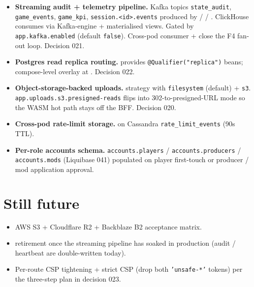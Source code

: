 \documentclass[11pt,a4paper,openany]{book}
\begin{document}
\begin{itemize}
  \item \textbf{Streaming audit + telemetry pipeline.} Kafka topics
        \texttt{state\_audit}, \texttt{game\_events},
        \texttt{game\_kpi}, \texttt{session.<id>.events} produced by
         /  /
        . ClickHouse consumes via
        Kafka-engine + materialised views. Gated by
        \texttt{app.kafka.enabled} (default \texttt{false}). Cross-pod
        consumer +  close the F4
        fan-out loop. Decision 021.
  \item \textbf{Postgres read replica routing.}
         provides
        \texttt{@Qualifier("replica")} beans; compose-level overlay at
        . Decision 022.
  \item \textbf{Object-storage-backed uploads.}
         strategy with \texttt{filesystem}
        (default) + \texttt{s3}. \texttt{app.uploads.s3.presigned-reads}
        flips  into 302-to-presigned-URL
        mode so the WASM hot path stays off the BFF. Decision 020.
  \item \textbf{Cross-pod rate-limit storage.}
         on Cassandra
        \texttt{rate\_limit\_events} (90s TTL).
  \item \textbf{Per-role accounts schema.} \texttt{accounts.players}
        / \texttt{accounts.producers} / \texttt{accounts.mods}
        (Liquibase 041) populated on player first-touch or producer /
        mod application approval.
\end{itemize}

\chapter{Still future}
\begin{itemize}
  \item AWS S3 + Cloudflare R2 + Backblaze B2 acceptance matrix.
  \item {} retirement once the streaming
        pipeline has soaked in production (audit / heartbeat are
        double-written today).
  \item Per-route CSP tightening + strict CSP (drop both
        \texttt{'unsafe-*'} tokens) per the three-step plan in
        decision 023.
\end{itemize}
\end{document}

